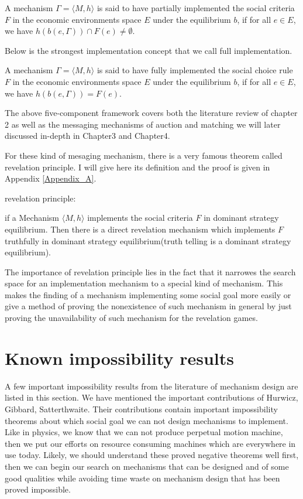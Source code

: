  \begin{definition}
A mechanism $\Gamma=\langle M,h\rangle$ is said to have partially implemented the social
criteria  $F$ in the economic environments space $E$ under the
equilibrium $b$, if for all $e \in E$, we have $h(b(e,\Gamma)) \cap
F(e) \not = \emptyset$.
\end{definition}


Below is the strongest implementation concept that we call full
implementation.

 \begin{definition}
A mechanism $\Gamma=\langle M,h\rangle$ is said to have fully implemented the social
choice rule  $F$ in the economic environments space $E$ under the
equilibrium $b$, if for all $e \in E$, we have $h(b(e,\Gamma)) = F(e)$.
\end{definition}



The above five-component framework covers both the literature review of chapter 2 as well as the messaging
mechanisms of auction and matching we will later discussed in-depth in
Chapter3 and Chapter4.

For these kind of mesaging mechanism, there is a very famous
theorem called revelation principle. I will give here its definition
and the proof is given in Appendix \ref{Appendix_A}.

\begin{thm*}
revelation principle:

if a Mechanism $\langle M, h\rangle$ implements the social criteria 
$F$ in dominant strategy
equilibrium. Then there is a direct revelation mechanism which
implements $F$ truthfully in dominant strategy equilibrium(truth
telling is a dominant strategy equilibrium). 

\end{thm*}

The importance of revelation principle lies in the fact that it narrowes the search space for an implementation mechanism to a special kind of mechanism. This makes the finding of a mechanism implementing some social goal more easily or give a method of proving the nonexistence of such mechanism in general by just proving the unavailability of such mechanism for the revelation games.


\section{Known impossibility results}

A few important impossibility results from the literature of mechanism design are listed in this section.
We have mentioned the important
contributions of Hurwicz, Gibbard, Satterthwaite. Their contributions contain
important impossibility theorems about which social goal we can not design mechanisms to implement. Like
in physics, we know that we can not produce perpetual motion machine,
then we put our efforts on resource consuming machines which are
everywhere in use today. Likely, we should understand these proved
negative theorems well first, then we can begin our search on
mechanisms that can be designed and of some good qualities while
avoiding time waste on mechanism design that has been proved impossible.

